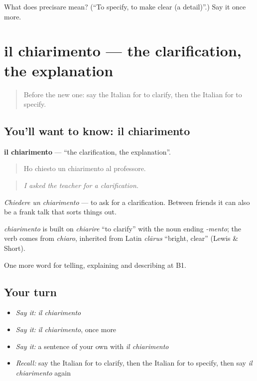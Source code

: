 \begin{tcolorbox}[breakable,colback=teal!4,colframe=teal!35!black,title={Before you move on}]
What does precisare mean? (\textquotedblleft{}To specify, to make clear (a detail)\textquotedblright{}.) Say it once more.
\end{tcolorbox}
\section[il chiarimento]{il chiarimento — the clarification, the explanation}

\label{lesson:IT-C346-chiarimento}



\begin{quote}
Before the new one: say the Italian for to clarify, then the Italian for to specify.
\end{quote}

\subsection*{You'll want to know: il chiarimento}
\textbf{il chiarimento} — \textquotedblleft{}the clarification, the explanation\textquotedblright{}.

\begin{quote}
Ho chiesto un chiarimento al professore.
\end{quote}

\begin{quote}
\emph{I asked the teacher for a clarification.}
\end{quote}

\emph{Chiedere un chiarimento} — to ask for a clarification. Between friends it can also be a frank talk that sorts things out.

\begin{cousinweb}
\emph{chiarimento} is built on \emph{chiarire} \textquotedblleft{}to clarify\textquotedblright{} with the noun ending \emph{-mento}; the verb comes from \emph{chiaro}, inherited from Latin \emph{clārus} \textquotedblleft{}bright, clear\textquotedblright{} (Lewis \& Short).
\end{cousinweb}

\begin{grammarlens}[title={What you've built}]
One more word for telling, explaining and describing at B1.
\end{grammarlens}

\subsection*{Your turn}
\begin{itemize}
\raggedright
  \item \emph{Say it:} \emph{il chiarimento}
  \item \emph{Say it:} \emph{il chiarimento}, once more
  \item \emph{Say it:} a sentence of your own with \emph{il chiarimento}
  \item \emph{Recall:} say the Italian for to clarify, then the Italian for to specify, then say \emph{il chiarimento} again
\end{itemize}

